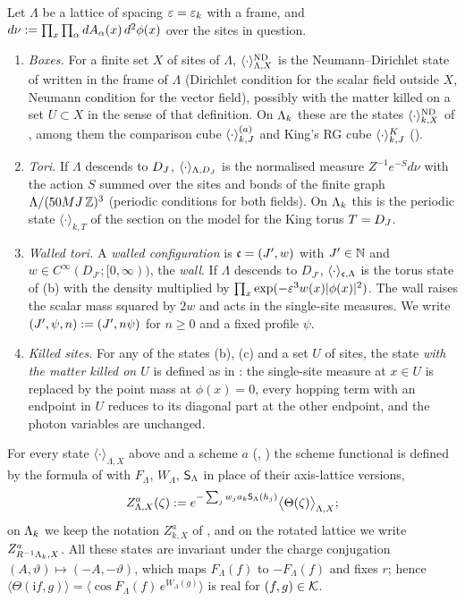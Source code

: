 \begin{definition}\label{rot:def:tori}
Let $\Lambda$ be a lattice of spacing $\varepsilon=\varepsilon_k$ with a frame, and $d\nu:=\prod_x\prod_\alpha dA_\alpha(x)\,d^2\phi(x)$ over the sites in question.
\begin{enumerate}[label=\textup{(\alph*)},leftmargin=*]
\item \emph{Boxes.} For a finite set $X$ of sites of $\Lambda$, $\langle\cdot\rangle^{\mathrm{ND}}_{\Lambda,X}$ is the Neumann--Dirichlet state of  written in the frame of $\Lambda$ (Dirichlet condition for the scalar field outside $X$, Neumann condition for the vector field), possibly with the matter killed on a set $U\subset X$ in the sense of that definition. On $\Lambda_k$ these are the states $\langle\cdot\rangle^{\mathrm{ND}}_{k,X}$ of , among them the comparison cube $\langle \cdot\rangle^{(a)}_{k,J}$ and King's RG cube $\langle \cdot\rangle^{K}_{k,J}$ ().
\item \emph{Tori.} If $\Lambda$ descends to $D_J$, $\langle\cdot\rangle_{\Lambda,D_J}$ is the normalised measure $Z^{-1}e^{-S}d\nu$ with the action $S$ summed over the sites and bonds of the finite graph $\Lambda/(50MJ\,\mathbb Z)^3$ (periodic conditions for both fields). On $\Lambda_k$ this is the periodic state $\langle\cdot\rangle_{k,T}$ of the section on the model for the King torus $T=D_J$.
\item \emph{Walled tori.} A \emph{walled configuration} is $\mathfrak c=(J',w)$ with $J'\in\mathbb N$ and $w\in C^\infty(D_{J'};[0,\infty))$, the \emph{wall}. If $\Lambda$ descends to $D_{J'}$, $\langle\cdot\rangle_{\mathfrak c,\Lambda}$ is the torus state of (b) with the density multiplied by $\prod_x\exp(-\varepsilon^3w(x)|\phi(x)|^2)$. The wall raises the scalar mass squared by $2w$ and acts in the single-site measures. We write $(J',\psi,n):=(J',n\psi)$ for $n\ge0$ and a fixed profile $\psi$.
\item \emph{Killed sites.} For any of the states (b), (c) and a set $U$ of sites, the state \emph{with the matter killed on $U$} is defined as in : the single-site measure at $x\in U$ is replaced by the point mass at $\phi(x)=0$, every hopping term with an endpoint in $U$ reduces to its diagonal part at the other endpoint, and the photon variables are unchanged.
\end{enumerate}
For every state $\langle\cdot\rangle_{\Lambda,X}$ above and a scheme $a$ (, ) the scheme functional is defined by the formula of  with $F_\Lambda$, $W_\Lambda$, $\mathsf S_\Lambda$ in place of their axis-lattice versions,
\[
Z^a_{\Lambda,X}(\zeta):= e^{-\sum_jw_ja_k\mathsf S_\Lambda(h_j)}\big\langle\Theta(\zeta)\big\rangle_{\Lambda,X};
\]
on $\Lambda_k$ we keep the notation $Z^a_{k,X}$ of , and on the rotated lattice we write $Z^a_{R^{-1}\Lambda_k,X}$. All these states are invariant under the charge conjugation $(A,\vartheta)\mapsto(-A,-\vartheta)$, which maps $F_\Lambda(f)$ to $-F_\Lambda(f)$ and fixes $r$; hence $\langle\Theta(\mathrm if,g)\rangle=\langle\cos F_\Lambda(f)\,e^{W_\Lambda(g)}\rangle$ is real for $(f,g)\in\mathcal K$.
\end{definition}


